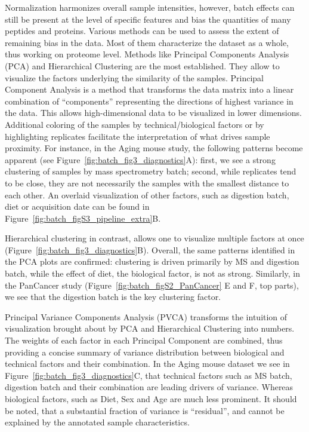 \documentclass[num-refs]{wiley-article}
\begin{document}
Normalization harmonizes overall sample intensities, however, batch effects can still be present at the level of specific features and bias the quantities of many peptides and proteins.
Various methods can be used to assess the extent of remaining bias in the data. Most of them characterize the dataset as a whole, thus working on proteome level. Methods like Principal Components Analysis (PCA) and Hierarchical Clustering are the most established. They allow to visualize the factors underlying the similarity of the samples.
Principal Component Analysis is a method that transforms the data matrix into a linear combination of “components” representing the directions of highest variance in the data. This allows high-dimensional data to be visualized in lower dimensions. Additional coloring of the samples by technical/biological factors or by highlighting replicates facilitate the interpretation of what drives sample proximity. For instance, in the Aging mouse study, the following patterns become apparent (see Figure~\ref{fig:batch_fig3_diagnostics}A): first, we see a strong clustering of samples by mass spectrometry batch; second, while replicates tend to be close, they are not necessarily the samples with the smallest distance to each other. An overlaid visualization of other factors, such as digestion batch, diet or acquisition date can be found in Figure~\ref{fig:batch_figS3_pipeline_extra}B. 
 
Hierarchical clustering in contrast, allows one to visualize multiple factors at once (Figure~\ref{fig:batch_fig3_diagnostics}B). Overall, the same patterns identified in the PCA plots are confirmed: clustering is driven primarily by MS and digestion batch, while the effect of diet, the biological factor, is not as strong. Similarly, in the PanCancer study (Figure~\ref{fig:batch_figS2_PanCancer} {E and F, top parts}), we see that the digestion batch is the key clustering factor.

Principal Variance Components Analysis (PVCA) transforms the intuition of visualization brought about by PCA and Hierarchical Clustering into numbers. The weights of each factor in each Principal Component are combined, thus providing a concise summary of variance distribution between biological and technical factors and their combination. In the Aging mouse dataset we see in Figure~\ref{fig:batch_fig3_diagnostics}C, that technical factors such as MS batch, digestion batch and their combination are leading drivers of variance. Whereas biological factors, such as Diet, Sex and Age are much less prominent. It should be noted, that a substantial fraction of variance is “residual”, and cannot be explained by the annotated sample characteristics.
\end{document}
